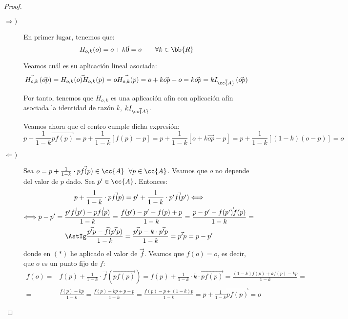 \begin{proof}\
    \begin{description}
        \item[$\Longrightarrow)$] En primer lugar, tenemos que:
        \begin{equation*}
            H_{o,k}(o)=o+k\vec{0} = o \qquad \forall k\in \bb{R}
        \end{equation*}
        
        Veamos cuál es su aplicación lineal asociada:
        \begin{equation*}
            \vec{H_{o,k}}\left(\vec{op}\right) = \vec{H_{o,k}(o)H_{o,k}(p)} = \vec{oH_{o,k}(p)} = o+k\vec{op} -o = k\vec{op} = kI_{\vec{\cc{A}}}\left(\vec{op}\right)
        \end{equation*}
        
        Por tanto, tenemos que $H_{o,k}$ es una aplicación afín con aplicación afín asociada la identidad de razón $k$, $kI_{\vec{\cc{A}}}$.

        Veamos ahora que el centro cumple dicha expresión:
        \begin{equation*}
            p+\frac{1}{1-k}\vec{pf(p)} = p + \frac{1}{1-k}[f(p)-p]
            = p + \frac{1}{1-k}[o+k\vec{op}-p]
            = p + \frac{1}{1-k}[(1-k)(o-p)] = o
        \end{equation*}

        \item[$\Longleftarrow)$] Sea $o=p+\frac{1}{1-k}\cdot \vec{pf(p)}\in \cc{A}~~\forall p\in \cc{A}$.
        Veamos que $o$ no depende del valor de $p$ dado. 
        Sea $p'\in \cc{A}$. Entonces:
        \begin{multline*}
            p+\frac{1}{1-k}\cdot \vec{pf(p)} = p'+\frac{1}{1-k}\cdot \vec{p'f(p')} \Longleftrightarrow \\ \Longleftrightarrow
            p-p' = \frac{\vec{p'f(p')} - \vec{pf(p)}}{1-k}
            = \frac{f(p')-p'-f(p)+p}{1-k}
            = \frac{p-p' - \vec{f(p')f(p)}}{1-k}
            =\\\AstIg \frac{\vec{p'p} - \vec{f}(\vec{p'p})}{1-k} = \frac{\vec{p'p} - k\cdot \vec{p'p}}{1-k} = \vec{p'p} = p-p'
        \end{multline*}
        donde en $(\ast)$ he aplicado el valor de $\vec{f}$. Veamos que $f(o)=o$, es decir, que $o$ es un punto fijo de $f$:
        \begin{equation*}\begin{split}
            f(o)=&f(p)  +\frac{1}{1-k}\cdot \vec{f}(\vec{pf(p)})
            =f(p)  +\frac{1}{1-k}\cdot k\cdot \vec{pf(p)}
            =\frac{(1-k)f(p) + kf(p) - kp}{1-k} =\\
            =&\frac{f(p) - kp}{1-k}
            =\frac{f(p) - kp + p-p}{1-k}
            =\frac{f(p)-p + (1-k)p}{1-k} = p + \frac{1}{1-k}\vec{pf(p)} = o
        \end{split}\end{equation*}


\end{description}
\end{proof}
